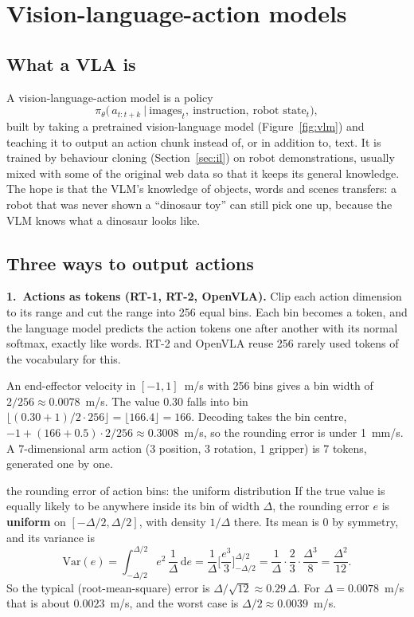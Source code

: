\section{Vision-language-action models}
\label{sec:vla}

\subsection{What a VLA is}
A vision-language-action model is a policy
\begin{equation}
\pi_\theta\big(\,a_{t:t+k}\ \big|\ \text{images}_t,\ \text{instruction},\ \text{robot state}_t\big),
\end{equation}
built by taking a pretrained vision-language model (Figure~\ref{fig:vlm}) and teaching it to output an action chunk instead of, or in addition to, text. It is trained by behaviour cloning (Section~\ref{sec:il}) on robot demonstrations, usually mixed with some of the original web data so that it keeps its general knowledge. The hope is that the VLM's knowledge of objects, words and scenes transfers: a robot that was never shown a ``dinosaur toy'' can still pick one up, because the VLM knows what a dinosaur looks like.

\subsection{Three ways to output actions}
\label{sec:actrep}
\textbf{1.\ Actions as tokens (RT-1, RT-2, OpenVLA).} Clip each action dimension to its range and cut the range into 256 equal bins. Each bin becomes a token, and the language model predicts the action tokens one after another with its normal softmax, exactly like words. RT-2 and OpenVLA reuse 256 rarely used tokens of the vocabulary for this.

\begin{examplebox}
An end-effector velocity in $[-1,1]$~m/s with 256 bins gives a bin width of $2/256\approx0.0078$~m/s. The value $0.30$ falls into bin $\lfloor (0.30+1)/2\cdot256\rfloor=\lfloor166.4\rfloor=166$. Decoding takes the bin centre, $-1+(166+0.5)\cdot 2/256\approx0.3008$~m/s, so the rounding error is under 1~mm/s. A 7-dimensional arm action (3 position, 3 rotation, 1 gripper) is 7 tokens, generated one by one.
\end{examplebox}

\begin{probbox}{the rounding error of action bins: the uniform distribution}
If the true value is equally likely to be anywhere inside its bin of width $\Delta$, the rounding error $e$ is \textbf{uniform} on $[-\Delta/2,\Delta/2]$, with density $1/\Delta$ there. Its mean is 0 by symmetry, and its variance is
\[
\mathrm{Var}(e)=\int_{-\Delta/2}^{\Delta/2}e^2\,\frac{1}{\Delta}\,\mathrm de=\frac1\Delta\Big[\frac{e^3}{3}\Big]_{-\Delta/2}^{\Delta/2}=\frac1\Delta\cdot\frac{2}{3}\cdot\frac{\Delta^3}{8}=\frac{\Delta^2}{12}.
\]
So the typical (root-mean-square) error is $\Delta/\sqrt{12}\approx0.29\,\Delta$. For $\Delta=0.0078$~m/s that is about $0.0023$~m/s, and the worst case is $\Delta/2\approx0.0039$~m/s.
\end{probbox}

